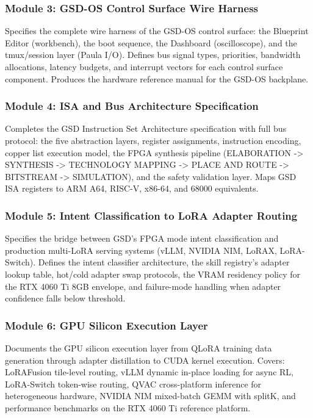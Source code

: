 \documentclass[11pt,letterpaper]{article}
\begin{document}
\subsubsection{Module 3: GSD-OS Control Surface Wire Harness}
Specifies the complete wire harness of the GSD-OS control surface: the Blueprint Editor (workbench), the boot sequence, the Dashboard (oscilloscope), and the tmux/session layer (Paula I/O). Defines bus signal types, priorities, bandwidth allocations, latency budgets, and interrupt vectors for each control surface component. Produces the hardware reference manual for the GSD-OS backplane.

\subsubsection{Module 4: ISA and Bus Architecture Specification}
Completes the GSD Instruction Set Architecture specification with full bus protocol: the five abstraction layers, register assignments, instruction encoding, copper list execution model, the FPGA synthesis pipeline (ELABORATION -> SYNTHESIS -> TECHNOLOGY MAPPING -> PLACE AND ROUTE -> BITSTREAM -> SIMULATION), and the safety validation layer. Maps GSD ISA registers to ARM A64, RISC-V, x86-64, and 68000 equivalents.

\subsubsection{Module 5: Intent Classification to LoRA Adapter Routing}
Specifies the bridge between GSD's FPGA mode intent classification and production multi-LoRA serving systems (vLLM, NVIDIA NIM, LoRAX, LoRA-Switch). Defines the intent classifier architecture, the skill registry's adapter lookup table, hot/cold adapter swap protocols, the VRAM residency policy for the RTX 4060 Ti 8GB envelope, and failure-mode handling when adapter confidence falls below threshold.

\subsubsection{Module 6: GPU Silicon Execution Layer}
Documents the GPU silicon execution layer from QLoRA training data generation through adapter distillation to CUDA kernel execution. Covers: LoRAFusion tile-level routing, vLLM dynamic in-place loading for async RL, LoRA-Switch token-wise routing, QVAC cross-platform inference for heterogeneous hardware, NVIDIA NIM mixed-batch GEMM with splitK, and performance benchmarks on the RTX 4060 Ti reference platform.
\end{document}
